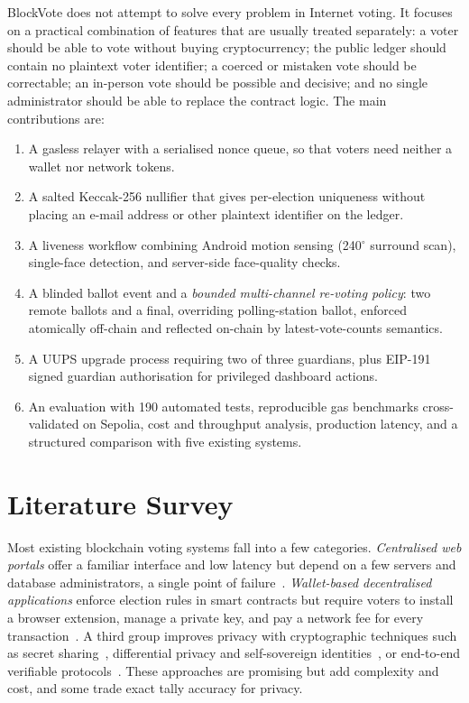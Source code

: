 \documentclass[conference]{IEEEtran}
\begin{document}
BlockVote does not attempt to solve every problem in Internet voting. It focuses on a practical combination of features that are usually treated separately: a voter should be able to vote without buying cryptocurrency; the public ledger should contain no plaintext voter identifier; a coerced or mistaken vote should be correctable; an in-person vote should be possible and decisive; and no single administrator should be able to replace the contract logic. The main contributions are:
\begin{enumerate}
  \item A gasless relayer with a serialised nonce queue, so that voters need neither a wallet nor network tokens.
  \item A salted Keccak-256 nullifier that gives per-election uniqueness without placing an e-mail address or other plaintext identifier on the ledger.
  \item A liveness workflow combining Android motion sensing (240$^\circ$ surround scan), single-face detection, and server-side face-quality checks.
  \item A blinded ballot event and a \emph{bounded multi-channel re-voting policy}: two remote ballots and a final, overriding polling-station ballot, enforced atomically off-chain and reflected on-chain by latest-vote-counts semantics.
  \item A UUPS upgrade process requiring two of three guardians, plus EIP-191 signed guardian authorisation for privileged dashboard actions.
  \item An evaluation with 190 automated tests, reproducible gas benchmarks cross-validated on Sepolia, cost and throughput analysis, production latency, and a structured comparison with five existing systems.
\end{enumerate}

\section{Literature Survey}
\label{sec:related}

Most existing blockchain voting systems fall into a few categories. \emph{Centralised web portals} offer a familiar interface and low latency but depend on a few servers and database administrators, a single point of failure~\cite{saha2025,abdulah2023,singh2024}. \emph{Wallet-based decentralised applications} enforce election rules in smart contracts but require voters to install a browser extension, manage a private key, and pay a network fee for every transaction~\cite{almadani2020,alvi2022}. A third group improves privacy with cryptographic techniques such as secret sharing~\cite{beydili2025}, differential privacy and self-sovereign identities~\cite{baniata2025}, or end-to-end verifiable protocols~\cite{panja2021}. These approaches are promising but add complexity and cost, and some trade exact tally accuracy for privacy.
\end{document}
